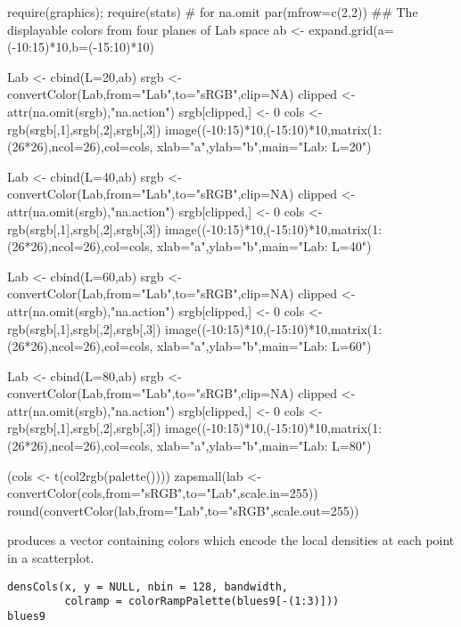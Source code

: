 %
\begin{Examples}
\begin{ExampleCode}
require(graphics); require(stats) # for na.omit
par(mfrow=c(2,2))
## The displayable colors from four planes of Lab space
ab <- expand.grid(a=(-10:15)*10,b=(-15:10)*10)

Lab <- cbind(L=20,ab)
srgb <- convertColor(Lab,from="Lab",to="sRGB",clip=NA)
clipped <- attr(na.omit(srgb),"na.action")
srgb[clipped,] <- 0
cols <- rgb(srgb[,1],srgb[,2],srgb[,3])
image((-10:15)*10,(-15:10)*10,matrix(1:(26*26),ncol=26),col=cols,
  xlab="a",ylab="b",main="Lab: L=20")

Lab <- cbind(L=40,ab)
srgb <- convertColor(Lab,from="Lab",to="sRGB",clip=NA)
clipped <- attr(na.omit(srgb),"na.action")
srgb[clipped,] <- 0
cols <- rgb(srgb[,1],srgb[,2],srgb[,3])
image((-10:15)*10,(-15:10)*10,matrix(1:(26*26),ncol=26),col=cols,
  xlab="a",ylab="b",main="Lab: L=40")

Lab <- cbind(L=60,ab)
srgb <- convertColor(Lab,from="Lab",to="sRGB",clip=NA)
clipped <- attr(na.omit(srgb),"na.action")
srgb[clipped,] <- 0
cols <- rgb(srgb[,1],srgb[,2],srgb[,3])
image((-10:15)*10,(-15:10)*10,matrix(1:(26*26),ncol=26),col=cols,
  xlab="a",ylab="b",main="Lab: L=60")

Lab <- cbind(L=80,ab)
srgb <- convertColor(Lab,from="Lab",to="sRGB",clip=NA)
clipped <- attr(na.omit(srgb),"na.action")
srgb[clipped,] <- 0
cols <- rgb(srgb[,1],srgb[,2],srgb[,3])
image((-10:15)*10,(-15:10)*10,matrix(1:(26*26),ncol=26),col=cols,
  xlab="a",ylab="b",main="Lab: L=80")

(cols <- t(col2rgb(palette())))
zapsmall(lab <- convertColor(cols,from="sRGB",to="Lab",scale.in=255))
round(convertColor(lab,from="Lab",to="sRGB",scale.out=255))
\end{ExampleCode}
\end{Examples}
%
\begin{Description}\relax
{} produces a vector containing colors which encode the
local densities at each point in a scatterplot.
\end{Description}
%
\begin{Usage}
\begin{verbatim}
densCols(x, y = NULL, nbin = 128, bandwidth,
         colramp = colorRampPalette(blues9[-(1:3)]))
blues9
\end{verbatim}
\end{Usage}
%

